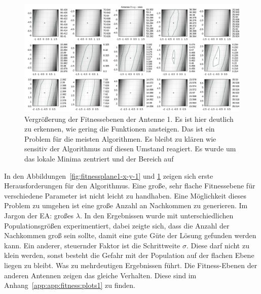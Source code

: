 \begin{figure}[ht!]
  \caption[Fitness Ebenen Heatmap, vergrößert]{Vergrößerung der Fitnessebenen der Antenne 1. Es ist hier deutlich zu erkennen, wie gering die Funktionen ansteigen. Das ist ein Problem für die meisten Algorithmen. Es bleibt zu klären wie sensitiv der Algorithmus auf diesen Umstand reagiert. Es wurde um das lokale Minima zentriert und der Bereich auf} %
  \begin{center}
   \includegraphics[width=\textwidth]{img/fitness/xy_a0zoomed.png}
  \end{center}
  \label{fig:fitnessplane1-x-y-zoom-1}
%
\end{figure}
%
In den Abbildungen~\ref{fig:fitnessplane1-x-y-1} und \ref{fig:fitnessplane1-x-y-zoom-1} zeigen sich erste Herausforderungen für den Algorithmus. Eine große, sehr flache Fitnessebene für verschiedene Parameter ist nicht leicht zu handhaben. Eine Möglichkeit dieses Problem zu umgehen ist eine große Anzahl an Nachkommen zu generieren. Im Jargon der EA: großes $\lambda$. In den Ergebnissen wurde mit unterschiedlichen Populationsgrößen experimentiert, dabei zeigte sich, dass die Anzahl der Nachkommen groß sein sollte, damit eine gute Güte der Lösung gefunden werden kann. Ein anderer, steuernder Faktor ist die Schrittweite $\sigma$. Diese darf nicht zu klein werden, sonst besteht die Gefahr mit der Population auf der flachen Ebene liegen zu bleibt. Was zu mehrdeutigen Ergebnissen führt. Die Fitness-Ebenen der anderen Antennen zeigen das gleiche Verhalten. Diese sind im Anhang~\ref{app:app:fitness:plots1} zu finden. \\

